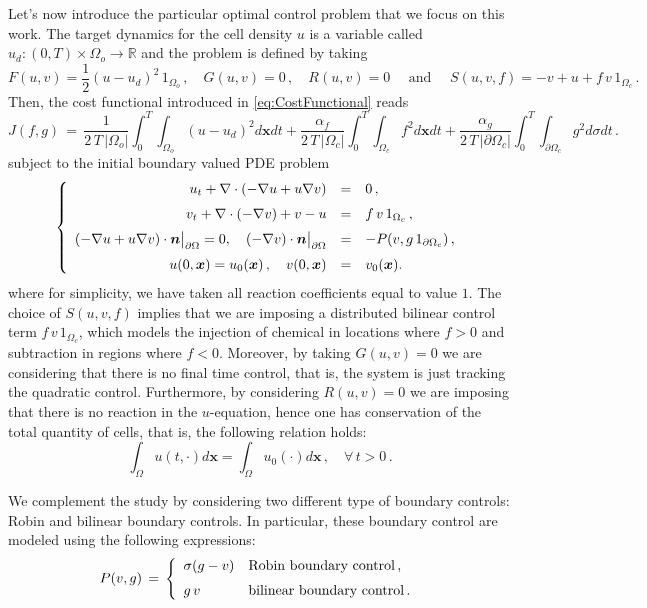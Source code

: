 \documentclass[11pt]{article}
\def \hueco{\noalign{\medskip}}
\def \beq{\begin{equation}}
\def \eeq{\end{equation}}
\def \ba{\begin{array}}
\def \ea{\end{array}}
\def \n{\boldsymbol{n}}
\def \x{\boldsymbol{x}}
\numberwithin{theorem}{section}
\begin{document}
Let's now introduce the particular optimal control problem that we focus on this work. The target dynamics for the cell density $u$ is a variable called $u_d:(0,T)\times \Omega_o\to \mathbb{R}$ and the problem is defined by taking 
$$
F(u,v)= \frac12 (u-u_d)^2 \, 1_{\Omega_o}\,,
\quad 
G(u,v)=0\,, 
\quad 
R(u,v)=0
\quad\mbox{ and }\quad 
S(u,v,f)=-v + u + f\, v\, 1_{\Omega_c}\,.
$$
Then, the cost functional introduced in \eqref{eq:CostFunctional} reads
%
\beq
J(f,g)
\,=\,
\frac{1}{2\,T\, |\Omega_o|}\int_0^T\!\!\int_{\Omega_o}(u-u_d)^2 d\x dt
+ \frac{\alpha_f}{2\,T\, |\Omega_c|}\int_0^T\!\!\int_{\Omega_c} f^2 d\x dt
+ \frac{\alpha_g}{2\,T\, |\partial\Omega_c|} \int_0^T \int_{\partial\Omega_c} g^2 d\sigma dt\,.
\eeq
subject to the initial boundary valued PDE problem
\beq\label{eq:PDEsystem}
\left\{\ba{rcl}
u_t + \nabla\cdot (-\nabla u + u \nabla v) 
&=&
0\,,
\\ \hueco
v_t + \nabla\cdot (-\nabla v) +v - u
&=&
 f\, v\, 1_{\Omega_c}\,,
 \\ \hueco
(-\nabla u + u \nabla v)\cdot \n \big|_{\partial\Omega}
=0,
\quad
(-\nabla v)\cdot \n \big|_{\partial\Omega}
&=&
-P(v,g\, 1 _{\partial\Omega_c})\,,
 \\ \hueco
 u(0,\x)=u_0(\x)\,,\quad v(0,\x)&=&v_0(\x) .
\ea\right.
\eeq
where for simplicity, we have taken all reaction coefficients equal to value $1$. 
The choice of $S(u,v,f)$ implies that we are imposing a distributed bilinear control term $f\, v\, 1_{\Omega_c}$, which models the injection of chemical in locations where $f> 0$ and subtraction in regions where $f< 0$. 
Moreover, by taking $G(u,v)=0$ we are considering that there is no final time control, that is, the system is just tracking the quadratic control. Furthermore, by considering $R(u,v)=0$ we are imposing that there is no reaction in the $u$-equation, hence one has conservation of the total quantity of  cells, that is, the following relation holds:
\begin{equation} \label{cons-u}
\int_\Omega u(t,\cdot)d\x=\int_\Omega u_0(\cdot)d\x\,,\quad \forall\, t>0\,.
\end{equation}


We complement the study by considering two different type of boundary controls: Robin and bilinear boundary controls. 
In particular, these boundary control are modeled using the following expressions:
\beq\label{eq:typesBoundaryControls}
P(v,g)
\,=\,
\left\{\ba{ll}
\sigma(g-v) & \mbox{Robin boundary control}\,,
\\ \hueco
 g\, v & \mbox{bilinear boundary control}\,.
\ea\right.
\eeq
\end{document}
